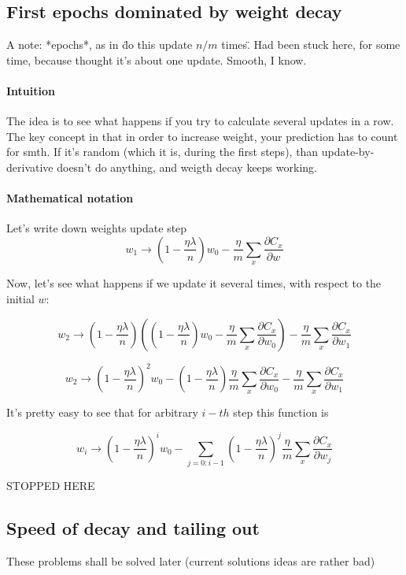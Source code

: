 \documentclass{article}
\begin{document}
\subsection{First epochs dominated by weight decay}

A note: *epochs*, as in \"do this update $n/m$ times\".
Had been stuck here, for some time, because thought it's about one update. Smooth, I know.

\paragraph{Intuition}
The idea is to see what happens if you try to calculate several updates in a row.
The key concept in that in order to increase weight, your prediction has to count for smth.
If it's random (which it is, during the first steps), than update-by-derivative doesn't do anything, and weigth decay keeps working.
\paragraph{Mathematical notation}
Let's write down weights update step
$$ w_{1} \rightarrow \left(1-\frac{\eta \lambda}{n}\right) w_{0} -\frac{\eta}{m}
  \sum_x \frac{\partial C_x}{\partial w}$$

Now, let's see what happens if we update it several times, with respect to the initial $w$:

$$ w_{2} \rightarrow (1-\frac{\eta \lambda}{n})(
(1-\frac{\eta \lambda}{n}) w_{0} -\frac{\eta}{m} \sum_x \frac{\partial C_x}{\partial w_{0}}
) -\frac{\eta}{m} \sum_x \frac{\partial C_x}{\partial w_{1}}$$

$$ w_{2} \rightarrow (1-\frac{\eta \lambda}{n})^{2} w_{0} - (1-\frac{\eta \lambda}{n}) \frac{\eta}{m} \sum_x \frac{\partial C_x}{\partial w_{0}} - 
\frac{\eta}{m} \sum_x \frac{\partial C_x}{\partial w_{1}}$$

It's pretty easy to see that for arbitrary $i-th$ step this function is

$$ w_{i} \rightarrow (1-\frac{\eta \lambda}{n})^{i} w_{0} - \sum_{j = 0:i-1} (1-\frac{\eta \lambda}{n})^{j} \frac{\eta}{m} \sum_x \frac{\partial C_x}{\partial w_{j}}$$

STOPPED HERE

\subsection{Speed of decay and tailing out}
These problems shall be solved later (current solutions ideas are rather bad)
\end{document}
